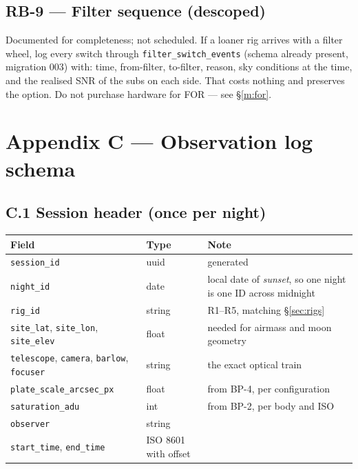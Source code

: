 \documentclass[11pt]{article}
\newcommand{\co}[1]{\texttt{\small #1}}
\begin{document}
\subsection*{RB-9 --- Filter sequence (descoped)}

Documented for completeness; not scheduled. If a loaner rig arrives with a
filter wheel, log every switch through \co{filter\_switch\_events} (schema
already present, migration 003) with: time, from-filter, to-filter, reason,
sky conditions at the time, and the realised SNR of the subs on each side. That
costs nothing and preserves the option. Do not purchase hardware for FOR --- see
\S\ref{m:for}.

\section*{Appendix C --- Observation log schema}

\subsection*{C.1 Session header (once per night)}

\begin{center}
\small
\begin{tabular}{@{}p{}p{}p{}@{}}
\toprule
\textbf{Field} & \textbf{Type} & \textbf{Note} \\
\midrule
\co{session\_id} & uuid & generated \\
\co{night\_id} & date & local date of \emph{sunset}, so one night is one ID across midnight \\
\co{rig\_id} & string & R1--R5, matching \S\ref{sec:rigs} \\
\co{site\_lat}, \co{site\_lon}, \co{site\_elev} & float & needed for airmass and moon geometry \\
\co{telescope}, \co{camera}, \co{barlow}, \co{focuser} & string & the exact optical train \\
\co{plate\_scale\_arcsec\_px} & float & from BP-4, per configuration \\
\co{saturation\_adu} & int & from BP-2, per body and ISO \\
\co{observer} & string & \\
\co{start\_time}, \co{end\_time} & ISO 8601 with offset & \\
\bottomrule
\end{tabular}
\end{center}
\end{document}
